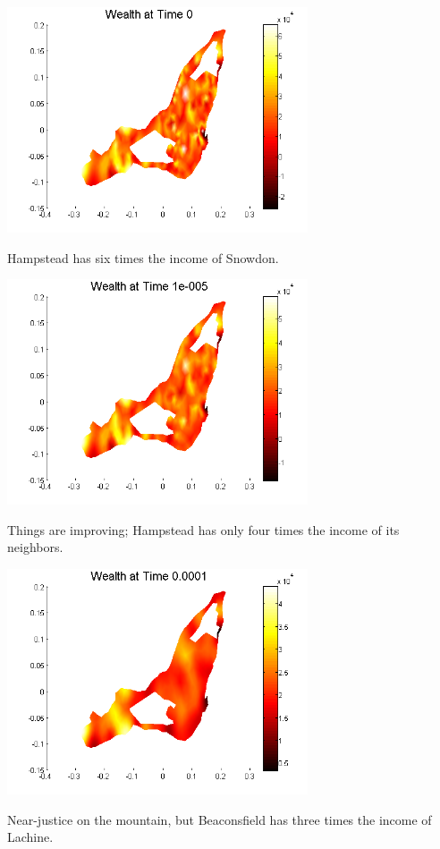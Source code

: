\documentclass[11pt]{beamer}
\begin{document}
\begin{frame}

\includegraphics[width=3.5in]{figs/mtl_0.png}

Hampstead has six times the income of Snowdon.

\end{frame}


\begin{frame}

\includegraphics[width=3.5in]{figs/mtl_1e-5.png}

Things are improving; Hampstead has only four times the income of
its neighbors.

\end{frame}


\begin{frame}


\includegraphics[width=3.5in]{figs/mtl_1e-4.png}

Near-justice on the mountain, but Beaconsfield has three times the
income of Lachine.

\end{frame}
\end{document}
